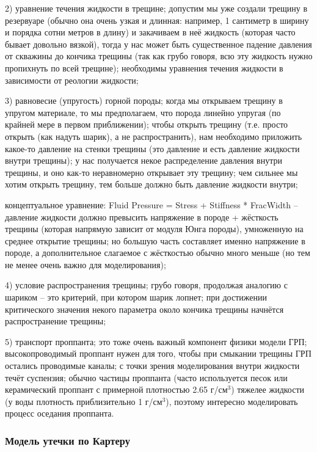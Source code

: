 \documentclass[main.tex]{subfiles}
\begin{document}
2) уравнение течения жидкости в трещине;
допустим мы уже создали трещину в резервуаре (обычно она очень узкая и длинная: например, 1 сантиметр в ширину и порядка сотни метров в длину) и закачиваем в неё жидкость (которая часто бывает довольно вязкой), тогда у нас может быть существенное падение давления от скважины до кончика трещины (так как грубо говоря, всю эту жидкость нужно пропихнуть по всей трещине);
необходимы уравнения течения жидкости в зависимости от реологии жидкости;

3) равновесие (упругость) горной породы;
когда мы открываем трещину в упругом материале, то мы предполагаем, что порода линейно упругая (по крайней мере в первом приближении);
чтобы открыть трещину (т.е. просто открыть (как надуть шарик), а не распространить), нам необходимо приложить какое-то давление на стенки трещины (это давление и есть давление жидкости внутри трещины);
у нас получается некое распределение давления внутри трещины, и оно как-то неравномерно открывает эту трещину; чем сильнее мы хотим открыть трещину, тем больше должно быть давление жидкости внутри;

концептуальное уравнение: Fluid Pressure = Stress + Stiffness * FracWidth -- давление жидкости должно превысить напряжение в породе + жёсткость трещины (которая напрямую зависит от модуля Юнга породы), умноженную на среднее открытие трещины;
но большую часть составляет именно напряжение в породе, а дополнительное слагаемое с жёсткостью обычно много меньше (но тем не менее очень важно для моделирования); 

4) условие распространения трещины; грубо говоря, продолжая аналогию с шариком -- это критерий, при котором шарик лопнет; при достижении критического значения некого параметра около кончика трещины начнётся распространение трещины;

5) транспорт проппанта; это тоже очень важный компонент физики модели ГРП; высокопроводимый проппант нужен для того, чтобы при смыкании трещины ГРП остались проводимые каналы;
с точки зрения моделирования внутри жидкости течёт суспензия; обычно частицы проппанта (часто используется песок или керамический проппант с примерной плотностью 2.65 г/см$^3$) тяжелее жидкости (у воды плотность приблизительно 1 г/см$^3$), поэтому интересно моделировать процесс оседания проппанта.

\subsubsection{Модель утечки по Картеру}
\end{document}
